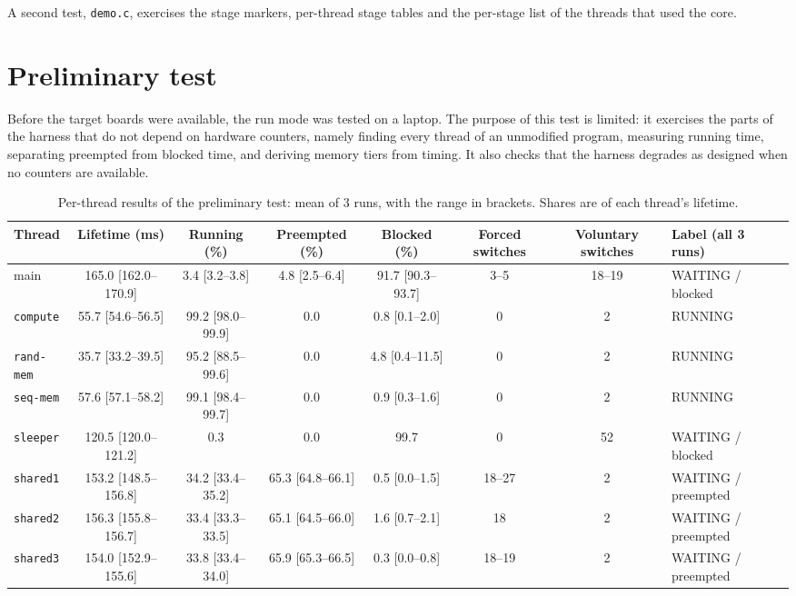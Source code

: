 \documentclass[10pt,a4paper,twocolumn]{article}
\newcommand{\code}[1]{\texttt{\small #1}}
\begin{document}
A second test, \code{demo.c}, exercises the stage markers, per-thread stage tables and the per-stage list of the threads that used the core.


\section{Preliminary test}\label{sec:prelim}

Before the target boards were available, the run mode was tested on a laptop. The purpose of this test is limited: it exercises the parts of the harness that do not depend on hardware counters, namely finding every thread of an unmodified program, measuring running time, separating preempted from blocked time, and deriving memory tiers from timing. It also checks that the harness degrades as designed when no counters are available.

\begin{table}[t]
\centering\footnotesize
\caption{Per-thread results of the preliminary test: mean of 3 runs, with the range in brackets. Shares are of each thread's lifetime.}
\label{tab:prelim}
\begin{tabularx}{\textwidth}{|l|c|c|c|c|C|C|l|}
\hline
\textbf{Thread} & \textbf{Lifetime (ms)} & \textbf{Running (\%)} & \textbf{Preempted (\%)} & \textbf{Blocked (\%)} & \textbf{Forced switches} & \textbf{Voluntary switches} & \textbf{Label (all 3 runs)} \\ \hline
main & 165.0 [162.0--170.9] & 3.4 [3.2--3.8] & 4.8 [2.5--6.4] & 91.7 [90.3--93.7] & 3--5 & 18--19 & WAITING / blocked \\ \hline
\code{compute} & 55.7 [54.6--56.5] & 99.2 [98.0--99.9] & 0.0 & 0.8 [0.1--2.0] & 0 & 2 & RUNNING \\ \hline
\code{rand-mem} & 35.7 [33.2--39.5] & 95.2 [88.5--99.6] & 0.0 & 4.8 [0.4--11.5] & 0 & 2 & RUNNING \\ \hline
\code{seq-mem} & 57.6 [57.1--58.2] & 99.1 [98.4--99.7] & 0.0 & 0.9 [0.3--1.6] & 0 & 2 & RUNNING \\ \hline
\code{sleeper} & 120.5 [120.0--121.2] & 0.3 & 0.0 & 99.7 & 0 & 52 & WAITING / blocked \\ \hline
\code{shared1} & 153.2 [148.5--156.8] & 34.2 [33.4--35.2] & 65.3 [64.8--66.1] & 0.5 [0.0--1.5] & 18--27 & 2 & WAITING / preempted \\ \hline
\code{shared2} & 156.3 [155.8--156.7] & 33.4 [33.3--33.5] & 65.1 [64.5--66.0] & 1.6 [0.7--2.1] & 18 & 2 & WAITING / preempted \\ \hline
\code{shared3} & 154.0 [152.9--155.6] & 33.8 [33.4--34.0] & 65.9 [65.3--66.5] & 0.3 [0.0--0.8] & 18--19 & 2 & WAITING / preempted \\ \hline
\end{tabularx}
\end{table}
\end{document}
